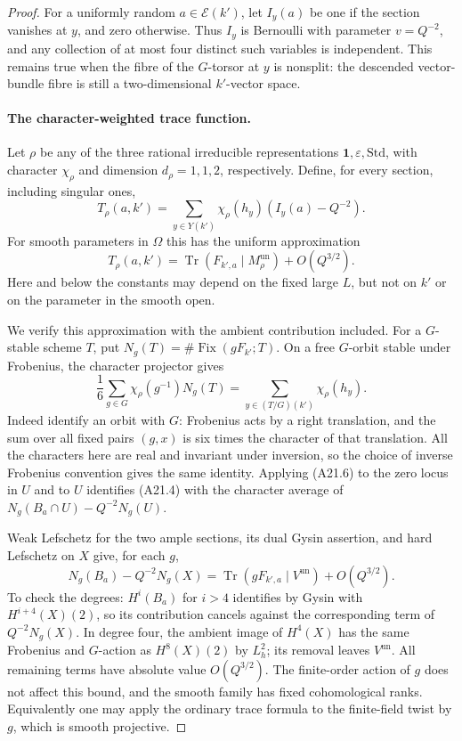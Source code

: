 \documentclass[11pt]{article}
\theoremstyle{remark}\newtheorem{remark}[theorem]{Remark}
\begin{document}
\begin{proof}
For a uniformly random $a\in\mathcal E(k')$, let $I_y(a)$ be one if the
section vanishes at $y$, and zero otherwise.  Thus $I_y$ is Bernoulli with
parameter $v=Q^{-2}$, and any collection of at most four distinct such
variables is independent.  This remains true when the fibre of the
$G$-torsor at $y$ is nonsplit: the descended vector-bundle fibre is still
a two-dimensional $k'$-vector space.

\paragraph{The character-weighted trace function.}
Let $\rho$ be any of the three rational irreducible representations
$\mathbf1,\varepsilon,\mathrm{Std}$, with character $\chi_\rho$ and dimension
$d_\rho=1,1,2$, respectively.  Define, for every section, including singular
ones,
\[
 T_\rho(a,k')=\sum_{y\in Y(k')}\chi_\rho(h_y)(I_y(a)-Q^{-2}).
                                                                  \tag{A21.4}
\]
For smooth parameters in $\Omega$ this has the uniform approximation
\[
 T_\rho(a,k')=\operatorname{Tr}(F_{k',a}\mid M_\rho^{\mathrm{un}})
                                  +O(Q^{3/2}).                   \tag{A21.5}
\]
Here and below the constants may depend on the fixed large $L$, but not
on $k'$ or on the parameter in the smooth open.

We verify this approximation with the ambient contribution included.
For a $G$-stable scheme $T$, put $N_g(T)=\#\operatorname{Fix}(gF_{k'};T)$.
On a free $G$-orbit stable under Frobenius, the character projector gives
\[
 \frac1{6}\sum_{g\in G}\chi_\rho(g^{-1})N_g(T)
       =\sum_{y\in(T/G)(k')}\chi_\rho(h_y).                       \tag{A21.6}
\]
Indeed identify an orbit with $G$: Frobenius acts by a right translation,
and the sum over all fixed pairs $(g,x)$ is six times the character of
that translation.  All the characters here are real and invariant under
inversion, so the choice of inverse Frobenius convention gives the same
identity.  Applying (A21.6) to the zero locus in $U$ and to $U$ identifies
(A21.4) with the character average of
$N_g(B_a\cap U)-Q^{-2}N_g(U)$.

Weak Lefschetz for the two ample sections, its dual Gysin assertion, and
hard Lefschetz on $X$ give, for each $g$,
\[
 N_g(B_a)-Q^{-2}N_g(X)
       =\operatorname{Tr}(gF_{k',a}\mid V^{\mathrm{un}})
                                      +O(Q^{3/2}).               \tag{A21.7}
\]
To check the degrees: $H^i(B_a)$ for $i>4$ identifies by Gysin with
$H^{i+4}(X)(2)$, so its contribution cancels against the corresponding
term of $Q^{-2}N_g(X)$.  In degree four, the ambient image of $H^4(X)$
has the same Frobenius and $G$-action as $H^8(X)(2)$ by $L_h^2$; its
removal leaves $V^{\mathrm{un}}$.  All remaining terms have absolute
value $O(Q^{3/2})$.  The finite-order action of $g$ does not affect this
bound, and the smooth family has fixed cohomological ranks.  Equivalently
one may apply the ordinary trace formula to the finite-field twist by
$g$, which is smooth projective.


\end{proof}
\end{document}
